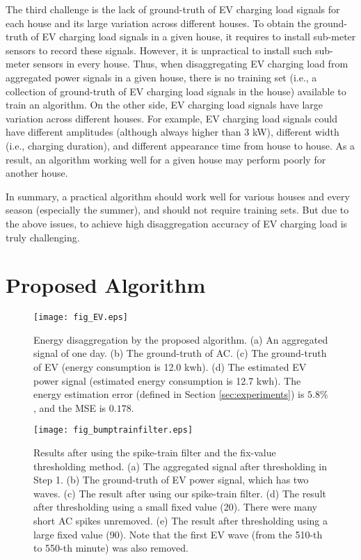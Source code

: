 \documentclass[conference]{IEEEtran}
\begin{document}
The third challenge is the lack of ground-truth of EV charging load signals for each house and  its large variation across different houses. To obtain the ground-truth of EV charging load signals in a given house, it requires to install sub-meter sensors to record these signals. However, it is unpractical to install such sub-meter sensors in every house. Thus, when disaggregating EV charging load from aggregated power signals in a given house, there is no training set (i.e., a collection of ground-truth of EV charging load signals in the house) available to train an algorithm. On the other side, EV charging load signals have large variation across different houses. For example,  EV charging load signals could have different amplitudes (although always higher than 3 kW), different width (i.e., charging duration), and different appearance time from house to house. As a result, an algorithm working well for a given house may perform poorly for another house.

In summary, a practical algorithm should work well for various houses and every season (especially the summer), and should not require training sets. But due to the above issues, to achieve high disaggregation accuracy of EV charging load is truly challenging.





\section{Proposed Algorithm}
\label{sec:EV}




\begin{figure}[t]
\centering
\texttt{[image: fig\_EV.eps]}
\caption{\footnotesize{Energy disaggregation by the proposed algorithm. (a) An aggregated signal of one day. (b) The ground-truth of AC. (c) The ground-truth of EV (energy consumption is 12.0 kwh). (d) The estimated EV power signal (estimated energy consumption is 12.7 kwh). The energy estimation error (defined in Section \ref{sec:experiments}) is $5.8\%$, and the MSE is $0.178$.}}
\label{fig:EVest}
\end{figure}







\begin{figure}[t]
\centering
\texttt{[image: fig\_bumptrainfilter.eps]}
\caption{\footnotesize{Results after using the spike-train filter and the fix-value thresholding method. (a) The aggregated signal after thresholding in Step 1. (b) The ground-truth of EV power signal, which has two waves. (c) The result after using our spike-train filter. (d) The result after thresholding using a small fixed value (20). There were many short AC spikes unremoved. (e) The result after thresholding using a large fixed value (90). Note that the first EV wave (from the 510-th to 550-th minute) was also removed.}}
\label{fig:bumptrainfilter}
\end{figure}
\end{document}
